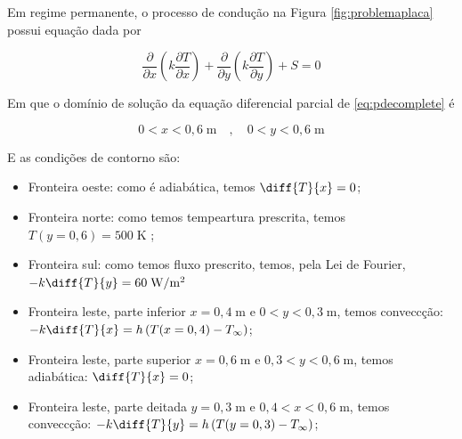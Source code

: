 \documentclass[12pt]{scrartcl}
\newcommand{\un}[1]{\;\textrm{#1}}
\begin{document}
Em regime permanente, o processo de condução na Figura \ref{fig:problemaplaca} possui 
equação dada por 

\begin{equation}\label{eq:pdecomplete}
    \frac{\partial}{\partial{x}} \left(k\frac{\partial{T}}{\partial{x}}\right) +
    \frac{\partial}{\partial{y}} \left(k\frac{\partial{T}}{\partial{y}}\right) +
    S = 0
\end{equation}

Em que o domínio de solução da equação diferencial parcial de \eqref{eq:pdecomplete} é

\begin{equation}\label{eq:domain}
    0 < x < 0,6 \un{m} \quad , \quad 0 < y < 0,6 \un{m}
\end{equation}

E as condições de contorno são:

\begin{itemize}
    \item Fronteira oeste: como é adiabática, temos $\diff{T}{x} = 0$;
    \item Fronteira norte: como temos tempeartura prescrita, temos $T(y=0,6) = 500 \un{K}$ ;
    \item Fronteira sul: como temos fluxo prescrito, temos, pela Lei de Fourier, $-k\diff{T}{y} = 60 \un{W/m$^2$}$
    \item Fronteira leste, parte inferior $x = 0,4 \un{m}$ e $0 < y < 0,3 \un{m}$, temos conveccção: $-k\diff{T}{x} = h\left(T(x=0,4) - T_{\infty}\right)$;
    \item Fronteira leste, parte superior $x = 0,6 \un{m}$ e $0,3 < y < 0,6 \un{m}$, temos adiabática: $\diff{T}{x} = 0$;
    \item Fronteira leste, parte deitada $y = 0,3 \un{m}$ e $0,4 < x < 0,6 \un{m}$, temos conveccção: $-k\diff{T}{y} = h\left(T(y=0,3) - T_{\infty}\right)$;
\end{itemize}
\end{document}
